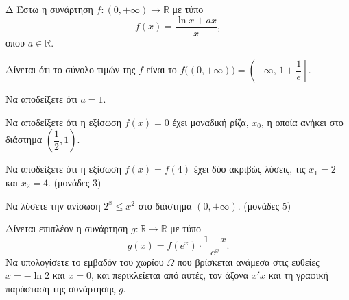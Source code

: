 \begin{thema}{Δ}
Έστω η συνάρτηση $f: (0, +\infty) \to \mathbb{R}$ με τύπο
\[
f(x) = \frac{\ln x + a x}{x},
\]
όπου $a \in \mathbb{R}$.

Δίνεται ότι το σύνολο τιμών της $f$ είναι το $f\bigl((0,+\infty)\bigr) = \left(-\infty,\, 1 + \dfrac{1}{e}\right]$.
\begin{erwthma}
    \item Να αποδείξετε ότι $a = 1$. 

    \item Να αποδείξετε ότι η εξίσωση $f(x) = 0$ έχει μοναδική ρίζα, $x_0$, η οποία ανήκει στο διάστημα $\left(\dfrac{1}{2}, 1\right)$. 


    \item
    \begin{alist}
        \item Να αποδείξετε ότι η εξίσωση $f(x) = f(4)$ έχει δύο ακριβώς λύσεις, τις $x_1 = 2$ και $x_2 = 4$. \hfill (μονάδες 3)
        \item Να λύσετε την ανίσωση $2^x \leq x^2$ στο διάστημα $(0, +\infty)$. \hfill (μονάδες 5)
    \end{alist}

    \item Δίνεται επιπλέον η συνάρτηση $g: \mathbb{R} \to \mathbb{R}$ με τύπο
    \[
    g(x) = f(e^x) \cdot \frac{1 - x}{e^x}.
    \]
    Να υπολογίσετε το εμβαδόν του χωρίου $\Omega$ που βρίσκεται ανάμεσα στις ευθείες $x = -\ln 2$ και $x = 0$, και περικλείεται από αυτές, τον άξονα $x'x$ και τη γραφική παράσταση της συνάρτησης $g$. 
\end{erwthma}
\end{thema}

